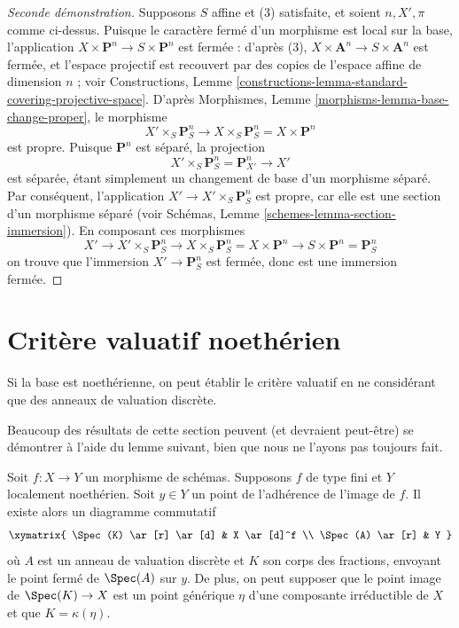 \begin{proof}[Seconde démonstration]
\medskip\noindent
Supposons $S$ affine et (3) satisfaite, et soient $n, X', \pi$ comme ci-dessus.
Puisque le caractère fermé d'un morphisme est local sur la base, l'application
$X \times \mathbf{P}^n \to S \times \mathbf{P}^n$ est fermée : d'après (3),
$X \times \mathbf{A}^n \to S \times \mathbf{A}^n$ est fermée, et
l'espace projectif est recouvert par des copies de l'espace affine de dimension $n$ ; voir
Constructions,
Lemme \ref{constructions-lemma-standard-covering-projective-space}.
D'après Morphismes, Lemme \ref{morphisms-lemma-base-change-proper},
le morphisme
$$
X' \times_S \mathbf{P}^n_S
\to
X \times_S \mathbf{P}^n_S =
X \times \mathbf{P}^n
$$
est propre. Puisque $\mathbf{P}^n$ est séparé, la projection
$$
X' \times_S \mathbf{P}^n_S = \mathbf{P}^n_{X'} \to X'
$$
est séparée, étant simplement un changement de base d'un morphisme
séparé. Par conséquent, l'application $X' \to X' \times_S \mathbf{P}^n_S$ est propre,
car elle est une section d'un morphisme séparé (voir
Schémas, Lemme \ref{schemes-lemma-section-immersion}).
En composant ces morphismes
$$
X' \to X' \times_S \mathbf{P}^n_S \to X \times_S \mathbf{P}^n_S
= X \times \mathbf{P}^n \to S \times \mathbf{P}^n = \mathbf{P}^n_S
$$
on trouve que l'immersion $X' \to \mathbf{P}^n_S$ est fermée, donc
est une immersion fermée.
\end{proof}





\section{Critère valuatif noethérien}
\label{section-Noetherian-valuative-criterion}

\noindent
Si la base est noethérienne, on peut établir le critère valuatif
en ne considérant que des anneaux de valuation discrète.

\medskip\noindent
Beaucoup des résultats de cette section peuvent (et devraient peut-être)
se démontrer à l'aide du lemme suivant, bien que nous ne l'ayons
pas toujours fait.

\begin{lemma}
\label{lemma-reach-point-closure-Noetherian}
Soit $f : X \to Y$ un morphisme de schémas.
Supposons $f$ de type fini et $Y$ localement noethérien.
Soit $y \in Y$ un point de l'adhérence de l'image de $f$.
Il existe alors un diagramme commutatif
$$
\xymatrix{
\Spec(K) \ar[r] \ar[d] & X \ar[d]^f \\
\Spec(A) \ar[r] & Y
}
$$
où $A$ est un anneau de valuation discrète et $K$ son corps des fractions,
envoyant le point fermé de $\Spec(A)$ sur $y$. De plus, on peut supposer
que le point image de $\Spec(K) \to X$ est un point générique $\eta$
d'une composante irréductible de $X$ et que $K = \kappa(\eta)$.
\end{lemma}

